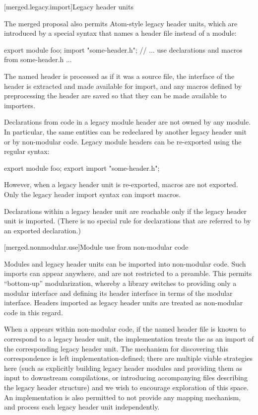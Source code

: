 [merged.legacy.import]{Legacy header units}

\pnum
The merged proposal also permits Atom-style legacy header units,
which are introduced by a special  syntax
that names a header file instead of a module:

\begin{codeblock}
export module foo;
import "some-header.h";
// ... use declarations and macros from some-header.h ...
\end{codeblock}

\pnum
The named header is processed as if it was a source file,
the interface of the header is extracted and made available for import,
and any macros defined by preprocessing the header are saved
so that they can be made available to importers.

\pnum
Declarations from code in a legacy module header
are not owned by any module.
In particular, the same entities can be redeclared
by another legacy header unit or by non-modular code.
Legacy module headers can be re-exported
using the regular  syntax:

\begin{codeblock}
export module foo;
export import "some-header.h";
\end{codeblock}

However, when a legacy header unit is re-exported,
macros are not exported.
Only the legacy header import syntax can import macros.

\pnum
Declarations within a legacy header unit
are reachable only if the legacy header unit is imported.
(There is no special rule for declarations
that are referred to by an exported declaration.)

[merged.nonmodular.use]{Module use from non-modular code}

\pnum
Modules and legacy header units can be imported into non-modular code.
Such imports can appear anywhere, and are not restricted to a preamble.
This permits ``bottom-up'' modularization,
whereby a library switches to providing only a modular interface
and defining its header interface in terms of the modular interface.
Headers imported as legacy header units are treated as non-modular code
in this regard.

\pnum
When a  appears within non-modular code,
if the named header file is known to correspond to a legacy header unit,
the implementation treats the  as an import
of the corresponding legacy header unit.
The mechanism for discovering this correspondence
is left implementation-defined;
there are multiple viable strategies here
(such as explicitly building legacy header modules and
providing them as input to downstream compilations, or
introducing accompanying files describing the legacy header structure)
and we wish to encourage exploration of this space.
An implementation is also permitted to not provide any mapping mechanism,
and process each legacy header unit independently.

